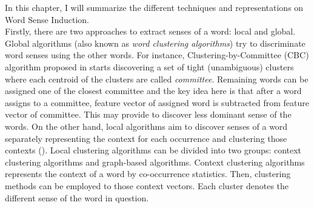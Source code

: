 In this chapter, I will summarize the different techniques and representations on Word Sense Induction. \\

Firstly, there are two approaches to extract senses of a word: local and global. Global algorithms (also known as \emph{word clustering algorithms}) try to discriminate word senses using the other words. For instance, Clustering-by-Committee (CBC) algorithm proposed in  \cite{pantel02discovering} starts discovering a set of tight (unambiguous) clusters where each centroid of the clusters are called \emph{committee}. Remaining words can be assigned one of the closest committee and the key idea here is that after a word assigns to a committee, feature vector of assigned word is subtracted from feature vector of committee. This may provide to discover less dominant sense of the words. On the other hand, local algorithms aim to discover senses of a word separately representing the context for each occurrence and clustering those contexts (\cite{schutze98automatic}). Local clustering algorithms can be divided into two groups: context clustering algorithms and graph-based algorithms. Context clustering algorithms represents the context of a word by co-occurrence statistics. Then, clustering methods can be employed to those context vectors. Each cluster denotes the different sense of the word in question. \\

